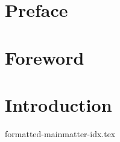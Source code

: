 \documentclass[a4paper,12pt,parskip=half,DIV=13,chapterprefix=true,titlepage=true,oneside,twocolumn,open=any]{scrbook}
\begin{document}
\chapter{Preface}
\blindtext

\chapter{Foreword}
\blindtext


\mainmatter
\setcounter{page}{1}

\chapter{Introduction}
\blindtext

{formatted-mainmatter-idx.tex}

\printindex
\end{document}

